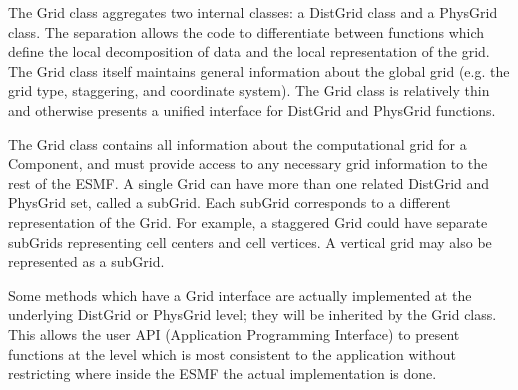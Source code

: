 



The Grid class aggregates two internal classes: a DistGrid class
and a PhysGrid class.  The separation allows the code to differentiate
between functions which define the local decomposition of data and
the local representation of the grid.  The Grid class itself maintains
general information about the global grid (e.g. the grid type, staggering,
and coordinate system).  The Grid class is relatively thin and
otherwise presents a unified interface for DistGrid and PhysGrid
functions.

The Grid class contains all information about the computational grid
for a Component, and must provide access to any necessary grid information
to the rest of the ESMF.  A single Grid can have more than one related
DistGrid and PhysGrid set, called a subGrid.  Each subGrid corresponds to
a different representation of the Grid.  For example, a staggered Grid could
have separate subGrids representing cell centers and cell vertices.  A
vertical grid may also be represented as a subGrid.

Some methods which have a Grid interface are actually implemented
at the underlying DistGrid or PhysGrid level; they will be inherited
by the Grid class.  This allows the user API (Application Programming
Interface) to present functions at the level which is most consistent
to the application without restricting where inside the ESMF the actual
implementation is done.
